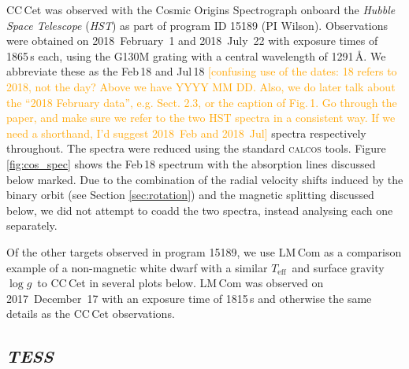 \documentclass[fleqn,usenatbib]{mnras}
\newcommand{\Teff}{\mbox{$T_{\mathrm{eff}}$}}
\newcommand{\logg}{\mbox{$\log g$}}
\newcommand{\bgc}[1]{\textcolor{orange}{[#1]}}
\begin{document}
CC\,Cet was observed with the Cosmic Origins Spectrograph \citep[COS,][]{greenetal12-1} onboard the \textit{Hubble Space Telescope} (\textit{HST}) as part of program ID 15189 (PI Wilson). Observations were obtained on 2018~February~1 and 2018~July~22 with exposure times of 1865\,s each, using the G130M grating with a central wavelength of 1291\,\AA. We abbreviate these as the Feb\,18 and Jul\,18 \bgc{confusing use of the dates: 18 refers to 2018, not the day? Above we have YYYY MM DD. Also, we do later talk about the ``2018 February data'', e.g. Sect. 2.3, or the caption of Fig.\,1. Go through the paper, and make sure we refer to the two HST spectra in a consistent way. If we need a shorthand, I'd suggest 2018~Feb and 2018~Jul} spectra respectively throughout. The spectra were reduced using the standard \textsc{calcos} tools. Figure \ref{fig:cos_spec} shows the Feb\,18 spectrum with the absorption lines discussed below marked. Due to the combination of the radial velocity shifts induced by the binary orbit (see Section \ref{sec:rotation}) and the magnetic splitting discussed below, we did not attempt to coadd the two spectra, instead analysing each one separately. 

Of the other targets observed in program 15189, we use LM\,Com as a comparison example of a non-magnetic white dwarf with a similar \Teff\ and surface gravity \logg\ to CC\,Cet in several plots below. LM\,Com was observed on 2017~December~17 with an exposure time of 1815\,s and otherwise the same details as the CC\,Cet observations. 



\subsection{\textit{TESS}}

\end{document}
